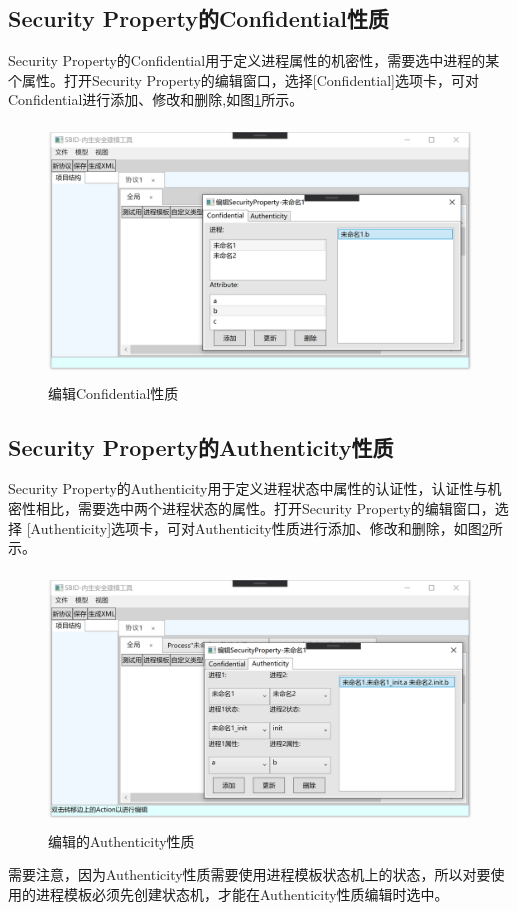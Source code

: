 \subsection{Security Property的Confidential性质}
Security Property的Confidential用于定义进程属性的机密性，需要选中进程的某个属性。打开Security Property的编辑窗口，选择[Confidential]选项卡，可对Confidential进行添加、修改和删除,如图\ref{security_edit_confidential}所示。
\begin{figure}[h]
	\centering
	\includegraphics[width=12cm,height=6.75cm]{imgs/security_edit_confidential.png}
	\caption{编辑Confidential性质}
	\label{security_edit_confidential}
\end{figure}
\subsection{Security Property的Authenticity性质}
Security Property的Authenticity用于定义进程状态中属性的认证性，认证性与机密性相比，需要选中两个进程状态的属性。打开Security Property的编辑窗口，选择 [Authenticity]选项卡，可对Authenticity性质进行添加、修改和删除，如图\ref{security_edit_authenticity}所示。
\begin{figure}[h]
	\centering
	\includegraphics[width=12cm,height=6.75cm]{imgs/security_edit_authenticity.png}
	\caption{编辑的Authenticity性质}
	\label{security_edit_authenticity}
\end{figure}
\par
需要注意，因为Authenticity性质需要使用进程模板状态机上的状态，所以对要使用的进程模板必须先创建状态机，才能在Authenticity性质编辑时选中。